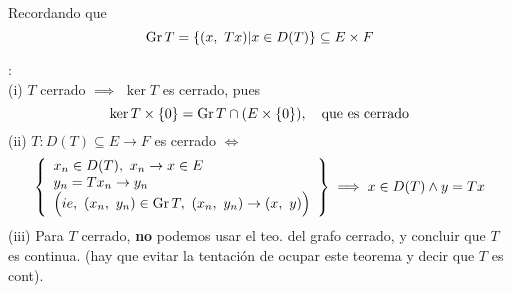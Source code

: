 Recordando que $$\operatorname{\mathop{\text{\upshape{Gr}}}} T = \{ (x, \ Tx) | x \in D (T) \} \subseteq E \times F$$

\begin{note}: \\
(i) $T$ cerrado $\implies$ $\ker T$ es cerrado, pues $$ \ker T \times \{ 0\} = \operatorname{\mathop{\text{\upshape{Gr}}}} T \cap (E \times \{ 0\}), \quad \text{que es cerrado}$$ 
(ii) $T: D(T) \subseteq E \to F$ es cerrado $\iff$
$$\left\{
\begin{array}{l}
{x_n \in D(T), \ x_n \to x \in E}\\
{y_n = T x_n \to y_n} \\
{\Bigl(ie, \ (x_n, \ y_n) \in \operatorname{\mathop{\text{\upshape{Gr}}}} T, \ (x_n, \ y_n) \to (x, \ y) \Bigr)}
\end{array}
\right\} \implies x \in D(T) \wedge y = T x
$$
(iii) Para $T$ cerrado, \textbf{no} podemos usar el teo. del grafo cerrado, y concluir que $T$ es continua. (hay que evitar la tentación de ocupar este teorema y decir que $T$ es cont).
\end{note}